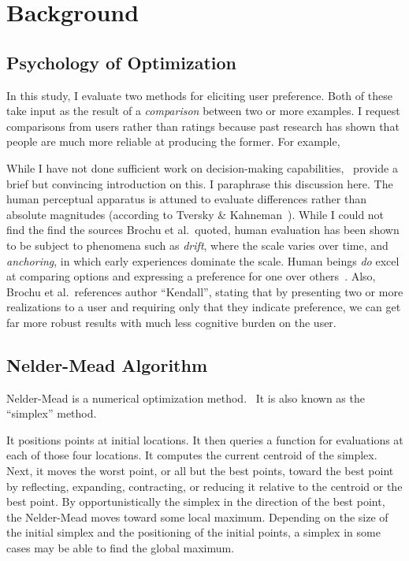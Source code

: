 \section{Background}

\subsection{Psychology of Optimization}

In this study, I evaluate two methods for eliciting user preference.
Both of these take input as the result of a \emph{comparison} between two or more examples.
I request comparisons from users rather than ratings because past research has shown that people are much more reliable at producing the former.
For example,

While I have not done sufficient work on decision-making capabilities,~\cite{brochu_tutorial_2010} provide a brief but convincing introduction on this.
I paraphrase this discussion here.
The human perceptual apparatus is attuned to evaluate differences rather than absolute magnitudes (according to Tversky \& Kahneman~\cite{kahneman_prospect_1977,tversky_advances_1992}).
While I could not find the find the sources Brochu et al.\ quoted, human evaluation has been shown to be subject to phenomena such as \emph{drift}, where the scale varies over time, and \emph{anchoring}, in which early experiences dominate the scale.
Human beings \emph{do} excel at comparing options and expressing a preference for one over others~\cite{Kingsley_preference_2006}.
Also, Brochu et al.\ references author ``Kendall'', stating that by presenting two or more realizations to a user and requiring only that they indicate preference, we can get far more robust results with much less cognitive burden on the user.

\subsection{Nelder-Mead Algorithm}

Nelder-Mead is a numerical optimization method.~
It is also known as the ``simplex'' method.

It positions points at initial locations.
It then queries a function for evaluations at each of those four locations.
It computes the current centroid of the simplex.
Next, it moves the worst point, or all but the best points, toward the best point by reflecting, expanding, contracting, or reducing it relative to the centroid or the best point.
By opportunistically the simplex in the direction of the best point, the Nelder-Mead moves toward some local maximum.
Depending on the size of the initial simplex and the positioning of the initial points, a simplex in some cases may be able to find the global maximum.


